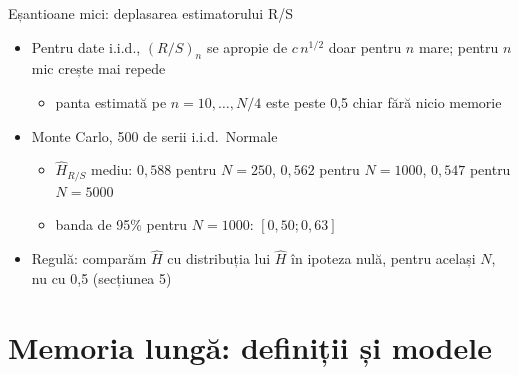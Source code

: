 \begin{frame}{Eșantioane mici: deplasarea estimatorului R/S}
\itemsize{\small}
\begin{itemize}
    \item Pentru date i.i.d., $(R/S)_n$ se apropie de $c\,n^{1/2}$ doar pentru $n$ mare; pentru $n$ mic crește mai repede 
    \begin{itemize}
        \item panta estimată pe $n = 10, \dots, N/4$ este peste 0,5 chiar fără nicio memorie
    \end{itemize}
    \item Monte Carlo, 500 de serii i.i.d.\ Normale
    \begin{itemize}
        \item $\hat H_{R/S}$ mediu: $0{,}588$ pentru $N = 250$, $0{,}562$ pentru $N = 1000$, $0{,}547$ pentru $N = 5000$
        \item banda de 95\% pentru $N = 1000$: $[0{,}50; 0{,}63]$
    \end{itemize}
    \item Regulă: comparăm $\hat H$ cu distribuția lui $\hat H$ în ipoteza nulă, pentru același $N$, nu cu 0,5 (secțiunea 5)
\end{itemize}
\end{frame}


\section{Memoria lungă: definiții și modele}

